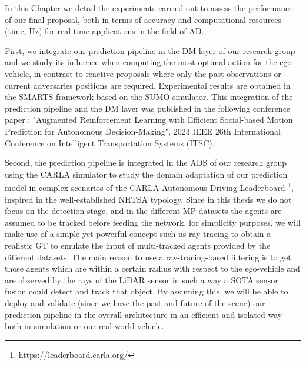 In this Chapter we detail the experiments carried out to assess the performance of our final proposal, both in terms of accuracy and computational resources (time, Hz) for real-time applications in the field of \ac{AD}. %


First, we integrate our prediction pipeline in the \acf{DM} layer of our research group and we study its influence when computing the most optimal action for the ego-vehicle, in contrast to reactive proposals where only the past observations or current adversaries positions are required. Experimental results are obtained in the \acf{SMARTS} \cite{SMARTS} framework based on the \ac{SUMO} \cite{Sumo} simulator. This integration of the prediction pipeline and the \ac{DM} layer was published in the following conference paper \cite{gutierrez2023augmented}: "Augmented Reinforcement Learning with Efficient Social-based Motion Prediction for Autonomous Decision-Making", 2023 IEEE 26th International Conference on Intelligent Transportation Systems (ITSC).
	
Second, the prediction pipeline is integrated in the \ac{ADS} of our research group using the \acf{CARLA} \cite{dosovitskiy2017carla} simulator to study the domain adaptation of our prediction model in complex scenarios of the \ac{CARLA} Autonomous Driving Leaderboard \footnote{https://leaderboard.carla.org/}, inspired in the well-established \ac{NHTSA} typology. Since in this thesis we do not focus on the detection stage, and in the different \ac{MP} datasets the agents are assumed to be tracked before feeding the network, for simplicity purposes, we will make use of a simple-yet-powerful concept such us ray-tracing to obtain a realistic \acf{GT} to emulate the input of multi-tracked agents provided by the different datasets. The main reason to use a ray-tracing-based filtering is to get those agents which are within a certain radius with respect to the ego-vehicle and are observed by the rays of the \ac{LiDAR} sensor in such a way a \ac{SOTA} sensor fusion could detect and track that object. By assuming this, we will be able to deploy and validate (since we have the past and future of the scene) our prediction pipeline in the overall architecture in an efficient and isolated way both in simulation or our real-world vehicle.

